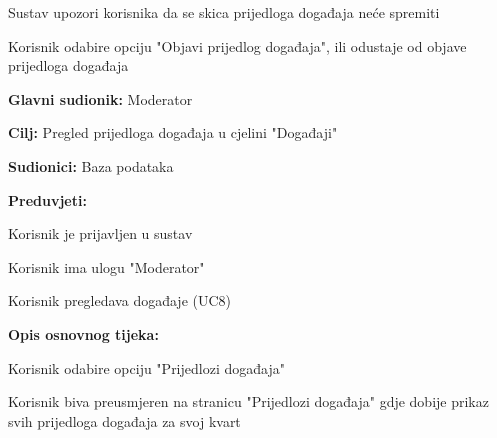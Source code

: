 \begin{packed_item}
\begin{packed_item}
\begin{packed_enum}
								\item Sustav upozori korisnika da se skica prijedloga događaja neće spremiti
								\item Korisnik odabire opciju "Objavi prijedlog događaja", ili odustaje od objave prijedloga događaja
								
							\end{packed_enum}
							
							
						\end{packed_item}
					\end{packed_item}						
					\noindent {}
					\begin{packed_item}
	
						\item \textbf{Glavni sudionik: }Moderator
						\item  \textbf{Cilj:} Pregled prijedloga događaja u cjelini "Događaji"
						\item  \textbf{Sudionici:} Baza podataka
						\item  \textbf{Preduvjeti:}
						\item[] \begin{packed_enum}
							\item Korisnik je prijavljen u sustav
							\item Korisnik ima ulogu "Moderator"
							\item Korisnik pregledava događaje (UC8)
						\end{packed_enum}
						\item  \textbf{Opis osnovnog tijeka:}
						
						\item[] \begin{packed_enum}
	
							\item Korisnik odabire opciju "Prijedlozi događaja" 
							\item Korisnik biva preusmjeren na stranicu "Prijedlozi događaja" gdje dobije prikaz svih prijedloga događaja za svoj kvart
							
						\end{packed_enum}
						\end{packed_item}
						
